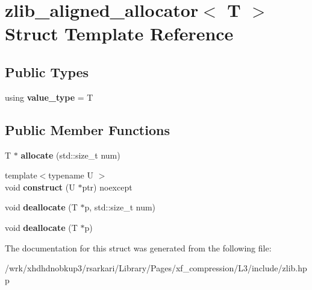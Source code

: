 \hypertarget{structzlib__aligned__allocator}{\section{zlib\-\_\-aligned\-\_\-allocator$<$ T $>$ Struct Template Reference}
\label{structzlib__aligned__allocator}
}
\subsection*{Public Types}
\begin{DoxyCompactItemize}
\item 
\hypertarget{structzlib__aligned__allocator_adfcc99fcd81e0b0c4dbd26ea51cb9986}{using {\bfseries value\-\_\-type} = T}\label{structzlib__aligned__allocator_adfcc99fcd81e0b0c4dbd26ea51cb9986}

\end{DoxyCompactItemize}
\subsection*{Public Member Functions}
\begin{DoxyCompactItemize}
\item 
\hypertarget{structzlib__aligned__allocator_a7bb6564c8ff34ec174e22a82e3259318}{T $\ast$ {\bfseries allocate} (std\-::size\-\_\-t num)}\label{structzlib__aligned__allocator_a7bb6564c8ff34ec174e22a82e3259318}

\item 
\hypertarget{structzlib__aligned__allocator_a536bca0042d96f416eec564fedc24dcd}{{\footnotesize template$<$typename U $>$ }\\void {\bfseries construct} (U $\ast$ptr) noexcept}\label{structzlib__aligned__allocator_a536bca0042d96f416eec564fedc24dcd}

\item 
\hypertarget{structzlib__aligned__allocator_a2cc7874853131a3de9a8947075f6237b}{void {\bfseries deallocate} (T $\ast$p, std\-::size\-\_\-t num)}\label{structzlib__aligned__allocator_a2cc7874853131a3de9a8947075f6237b}

\item 
\hypertarget{structzlib__aligned__allocator_a193f6feac7c4efcaae2ed95dbb169d11}{void {\bfseries deallocate} (T $\ast$p)}\label{structzlib__aligned__allocator_a193f6feac7c4efcaae2ed95dbb169d11}

\end{DoxyCompactItemize}


The documentation for this struct was generated from the following file\-:\begin{DoxyCompactItemize}
\item 
/wrk/xhdhdnobkup3/rsarkari/\-Library/\-Pages/xf\-\_\-compression/\-L3/include/zlib.\-hpp\end{DoxyCompactItemize}
